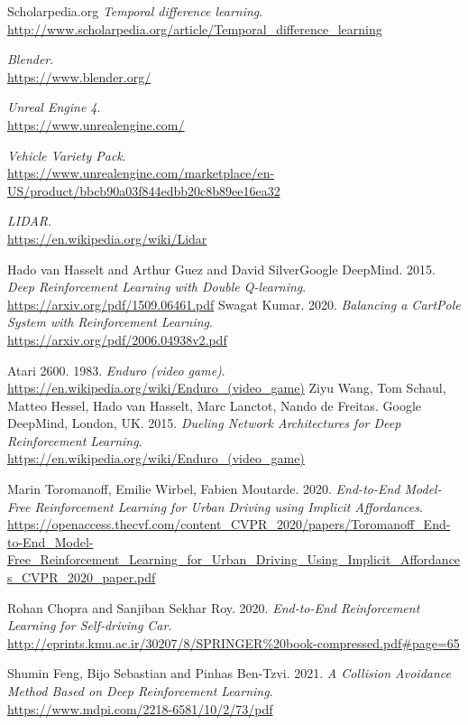 \documentclass[14pt]{extarticle}
\begin{document}
\begin{thebibliography}{999}
  Scholarpedia.org
  \emph{Temporal difference learning}.\\
  \url{http://www.scholarpedia.org/article/Temporal_difference_learning}
 
  \emph{Blender}.\\
  \url{https://www.blender.org/}
   
  \emph{Unreal Engine 4}.\\
  \url{https://www.unrealengine.com/}
   
   
  \emph{Vehicle Variety Pack}.\\
  \url{https://www.unrealengine.com/marketplace/en-US/product/bbcb90a03f844edbb20c8b89ee16ea32}
  
  \emph{LIDAR}.\\
  \url{https://en.wikipedia.org/wiki/Lidar}
  
  Hado van Hasselt and Arthur Guez and David SilverGoogle DeepMind. 2015.
  \emph{Deep Reinforcement Learning with Double Q-learning}.\\
  \url{  https://arxiv.org/pdf/1509.06461.pdf}
  Swagat Kumar. 2020.
  \emph{Balancing a CartPole System with Reinforcement Learning}.\\
  \url{https://arxiv.org/pdf/2006.04938v2.pdf}
 
 
  	Atari 2600. 1983.
  \emph{Enduro (video game)}.\\
  \url{https://en.wikipedia.org/wiki/Enduro_(video_game)}
  	Ziyu Wang, Tom Schaul, Matteo Hessel, Hado van Hasselt, Marc Lanctot, Nando de Freitas. Google DeepMind, London, UK. 2015.
  \emph{Dueling Network Architectures for Deep Reinforcement Learning}.\\
  \url{https://en.wikipedia.org/wiki/Enduro_(video_game)}
   
   
  	Marin Toromanoff, Emilie Wirbel, Fabien Moutarde. 2020.
  \emph{End-to-End Model-Free Reinforcement Learning
for Urban Driving using Implicit Affordances}.\\
  \url{https://openaccess.thecvf.com/content_CVPR_2020/papers/Toromanoff_End-to-End_Model-Free_Reinforcement_Learning_for_Urban_Driving_Using_Implicit_Affordances_CVPR_2020_paper.pdf}

  	Rohan Chopra and Sanjiban Sekhar Roy. 2020.
  \emph{End-to-End Reinforcement Learning
for Self-driving Car}.\\
  \url{http://eprints.kmu.ac.ir/30207/8/SPRINGER\%20book-compressed.pdf\#page=65}
  
  
  
  	Shumin Feng, Bijo Sebastian and Pinhas Ben-Tzvi. 2021.
  \emph{A Collision Avoidance Method Based on Deep
Reinforcement Learning}.\\
  \url{https://www.mdpi.com/2218-6581/10/2/73/pdf}

\end{thebibliography}
\end{document}
